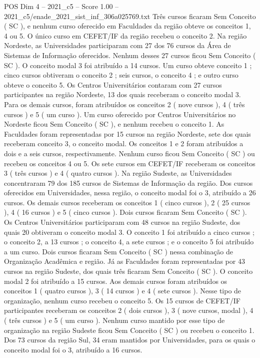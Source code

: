 \begin{textsample}{POS Dim 4 – 2021\_c5 – Score 1.00 – 2021\_c5/enade\_2021\_sist\_inf\_306a025769.txt}
Três cursos ficaram Sem Conceito ( SC ), e nenhum curso oferecido em Faculdades da região obteve os conceitos 1, 4 ou 5.
O único curso em CEFET/IF da região recebeu o conceito 2.
Na região Nordeste, as Universidades participaram com 27 dos 76 cursos da Área de Sistemas de Informação oferecidos.
Nenhum desses 27 cursos ficou Sem Conceito ( SC ).
O conceito modal 3 foi atribuído a 14 cursos.
Um curso obteve conceito 1 ; cinco cursos obtiveram o conceito 2 ; seis cursos, o conceito 4 ; e outro curso obteve o conceito 5.
Os Centros Universitários contaram com 27 cursos participantes na região Nordeste, 13 dos quais receberam o conceito modal 3.
Para os demais cursos, foram atribuídos os conceitos 2 ( nove cursos ), 4 ( três cursos ) e 5 ( um curso ).
Um curso oferecido por Centros Universitários no Nordeste ficou Sem Conceito ( SC ), e nenhum recebeu o conceito 1.
As Faculdades foram representadas por 15 cursos na região Nordeste, sete dos quais receberam conceito 3, o conceito modal.
Os conceitos 1 e 2 foram atribuídos a dois e a seis cursos, respectivamente.
Nenhum curso ficou Sem Conceito ( SC ) ou recebeu os conceitos 4 ou 5.
Os sete cursos em CEFET/IF receberam os conceitos 3 ( três cursos ) e 4 ( quatro cursos ).
Na região Sudeste, as Universidades concentraram 79 dos 185 cursos de Sistemas de Informação da região.
Dos cursos oferecidos em Universidades, nessa região, o conceito modal foi o 3, atribuído a 26 cursos.
Os demais cursos receberam os conceitos 1 ( cinco cursos ), 2 ( 25 cursos ), 4 ( 16 cursos ) e 5 ( cinco cursos ).
Dois cursos ficaram Sem Conceito ( SC ).
Os Centros Universitários participaram com 48 cursos na região Sudeste, dos quais 20 obtiveram o conceito modal 3.
O conceito 1 foi atribuído a cinco cursos ; o conceito 2, a 13 cursos ; o conceito 4, a sete cursos ; e o conceito 5 foi atribuído a um curso.
Dois cursos ficaram Sem Conceito ( SC ) nessa combinação de Organização Acadêmica e região.
Já as Faculdades foram representadas por 43 cursos na região Sudeste, dos quais três ficaram Sem Conceito ( SC ).
O conceito modal 2 foi atribuído a 15 cursos.
Aos demais cursos foram atribuídos os conceitos 1 ( quatro cursos ), 3 ( 14 cursos ) e 4 ( sete cursos ).
Nesse tipo de organização, nenhum curso recebeu o conceito 5.
Os 15 cursos de CEFET/IF participantes receberam os conceitos 2 ( dois cursos ), 3 ( nove cursos, modal ), 4 ( três cursos ) e 5 ( um curso ).
Nenhum curso mantido por esse tipo de organização na região Sudeste ficou Sem Conceito ( SC ) ou recebeu o conceito 1.
Dos 73 cursos da região Sul, 34 eram mantidos por Universidades, para os quais o conceito modal foi o 3, atribuído a 16 cursos.

\end{textsample}
